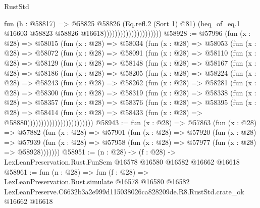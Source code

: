 \begin{lexlean}{RustStd}
\begin{coremodule}
                                          fun (h : @58817) =>
                                          @58825
                                            @58826
                                            (Eq.refl.{2} (Sort 1) @81)
                                            (heq_of_eq.{1}
                                              @16603
                                              @58823
                                              @58826
                                              @16618)))))))))))))))))))))
@58928 := @57996
    (fun (x : @28) =>
    @58015
      (fun (x : @28) =>
      @58034
        (fun (x : @28) =>
        @58053
          (fun (x : @28) =>
          @58072
            (fun (x : @28) =>
            @58091
              (fun (x : @28) =>
              @58110
                (fun (x : @28) =>
                @58129
                  (fun (x : @28) =>
                  @58148
                    (fun (x : @28) =>
                    @58167
                      (fun (x : @28) =>
                      @58186
                        (fun (x : @28) =>
                        @58205
                          (fun (x : @28) =>
                          @58224
                            (fun (x : @28) =>
                            @58243
                              (fun (x : @28) =>
                              @58262
                                (fun (x : @28) =>
                                @58281
                                  (fun (x : @28) =>
                                  @58300
                                    (fun (x : @28) =>
                                    @58319
                                      (fun (x : @28) =>
                                      @58338
                                        (fun (x : @28) =>
                                        @58357
                                          (fun (x : @28) =>
                                          @58376
                                            (fun (x : @28) =>
                                            @58395
                                              (fun (x : @28) =>
                                              @58414
                                                (fun (x : @28) =>
                                                @58433
                                                  (fun (x : @28) => @58880))))))))))))))))))))))))
@58943 := fun (x : @28) =>
  @57863
    (fun (x : @28) =>
    @57882
      (fun (x : @28) =>
      @57901
        (fun (x : @28) =>
        @57920
          (fun (x : @28) =>
          @57939 (fun (x : @28) => @57958 (fun (x : @28) => @57977 (fun (x : @28) => @58928)))))))
@58951 := (n : @28) ->
  (f : @28) -> LexLeanPreservation.Rust.FunSem @16578 @16580 @16582 @16662 @16618
@58961 := fun (n : @28) =>
  fun (f : @28) =>
  LexLeanPreservation.Rust.simulate
    @16578
    @16580
    @16582
    LexLeanPreserve.C6632b3a2e999d115038026ca828209de.R8.RustStd.crate_ok
    @16662
    @16618
\end{coremodule}
\end{lexlean}
